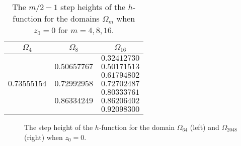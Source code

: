 \begin{table}[h]
  \caption{The $m/2-1$ step heights of the $h$-function for the domains $\Omega_m$ when $z_0=0$ for $m=4,8,16$.}
  \label{tab:0}
\centering
\begin{tabular}{ccc}
    \hline
  $\Omega_4$       & $\Omega_8$        & $\Omega_{16}$  \\ \hline
                   &                   & $0.32412730$  \\
                   & $0.50657767$      & $0.50171513$  \\
                   &                   & $0.61794802$  \\
 $0.73555154$      & $0.72992958$      & $0.72702487$  \\
                   &                   & $0.80333761$  \\
                   & $0.86334249$      & $0.86206402$  \\
                   &                   & $0.92098300$  \\
\hline
\end{tabular}
\end{table}




\begin{figure}[ht] %
\centerline{
\hfill
{}}
\caption{The step height of the $h$-function for the domain $\Omega_{64}$ (left) and $\Omega_{2048}$ (right) when $z_0=0$.}
\label{fig:hm-0}
\end{figure}
